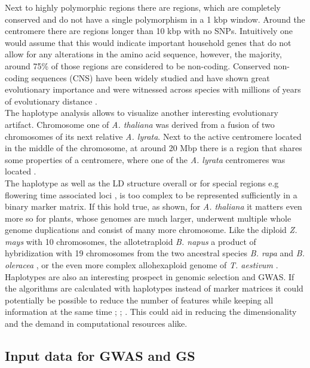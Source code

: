Next to highly polymorphic regions there are regions, which are completely conserved and
do not have a single polymorphism in a 1 kbp window. Around the centromere there are
regions longer than 10 kbp with no SNPs. Intuitively one would assume that this would
indicate important household genes that do not allow for any alterations in the amino acid
sequence, however, the majority, around 75\% of those regions are considered to be
non-coding. Conserved non-coding sequences (CNS) have been widely studied and have shown
great evolutionary importance and were witnessed across species with millions of years of
evolutionary distance \cite{Burgess946}. \\
The haplotype analysis allows to visualize another interesting evolutionary
artifact. Chromosome one of \textit{A. thaliana} was derived from a fusion of two
chromosomes of its next relative \textit{A. lyrata}. Next to the active centromere located
in the middle of the chromosome, at around 20 Mbp there is a region that shares some
properties of a centromere, where one of the \textit{A. lyrata} centromeres was
located \cite{koch2007evolution}. \\
The haplotype as well as the LD structure overall or for special regions e.g flowering
time associated loci \cite{li2014multiple}, is too complex to be represented sufficiently
in a binary marker matrix. If this hold true, as shown, for \textit{A. thaliana} it matters
even more so for plants, whose genomes are much larger, underwent multiple whole genome
duplications and consist of many more chromosome. Like the diploid \textit{Z. mays} with
10 chromosomes, the allotetraploid \textit{B. napus} a product of hybridization with 19
chromosomes from the two ancestral species \textit{B. rapa} and \textit{B. oleracea}
\cite{liu2018brassica}, or the even more complex allohexaploid genome of
\textit{T. aestivum} \cite{international2018shifting}. \\
Haplotypes are also an interesting prospect in genomic selection and GWAS. If the
algorithms are calculated with haplotypes instead of marker matrices it could potentially
be possible to reduce the number of features while keeping all information at the same
time \cite{calus2008accuracy}; \cite{cuyabano2014genomic};
\cite{bekele2018haplotype}. This could aid in reducing the dimensionality and the demand
in computational resources alike.

\subsection{Input data for GWAS and GS}

